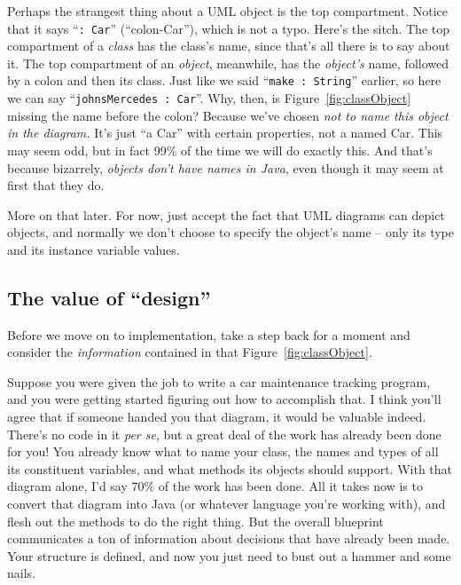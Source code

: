 Perhaps the strangest thing about a UML object is the top compartment. Notice
that it says ``\texttt{:~Car}'' (``colon-Car''), which is not a typo. Here's
the sitch. The top compartment of a \textit{class} has the class's name, since
that's all there is to say about it. The top compartment of an \textit{object},
meanwhile, has the \textit{object's} name, followed by a colon and then its
class. Just like we said ``\texttt{make :~String}'' earlier, so here we can
say ``\texttt{johnsMercedes :~Car}''. Why, then, is
Figure~\ref{fig:classObject} missing the name before the colon? Because we've
chosen \textit{not to name this object in the diagram.} It's just ``a Car''
with certain properties, not a named Car. This may seem odd, but in fact 99\%
of the time we will do exactly this. And that's because bizarrely,
\textit{objects don't have names in Java}, even though it may seem at first
that they do.

More on that later. For now, just accept the fact that UML diagrams can depict
objects, and normally we don't choose to specify the object's name -- only its
type and its instance variable values.


\subsection{The value of ``design''}

Before we move on to implementation, take a step back for a moment and
consider the \textit{information} contained in that
Figure~\ref{fig:classObject}.

Suppose you were given the job to write a car maintenance tracking program,
and you were getting started figuring out how to accomplish that. I think
you'll agree that if someone handed you that diagram, it would be valuable
indeed. There's no code in it \textit{per se}, but a great deal of the work
has already been done for you! You already know what to name your class, the
names and types of all its constituent variables, and what methods its objects
should support. With that diagram alone, I'd say 70\% of the work has been
done. All it takes now is to convert that diagram into Java (or whatever
language you're working with), and flesh out the methods to do the right
thing. But the overall blueprint communicates a ton of information about
decisions that have already been made. Your structure is defined, and now you
just need to bust out a hammer and some nails.



